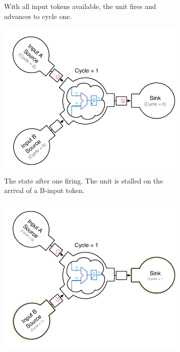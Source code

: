 \begin{figure}
\begin{subfigure}[t]{0.45\textwidth}
        \caption{With all input tokens available, the unit fires and advances to cycle one.}
    \end{subfigure}
    \begin{subfigure}[t]{0.45\textwidth}
        \captionsetup{margin=0.25cm}
        \includegraphics[width=\columnwidth]{figures/adder-example3.pdf}
        \caption{The state after one firing. The unit is stalled on the arrival of a B-input token.}
    \end{subfigure}
    \begin{subfigure}[t]{0.45\textwidth}
        \captionsetup{margin=0.25cm}
        \includegraphics[width=\columnwidth]{figures/adder-example4.pdf}

\end{subfigure}
\end{figure}
